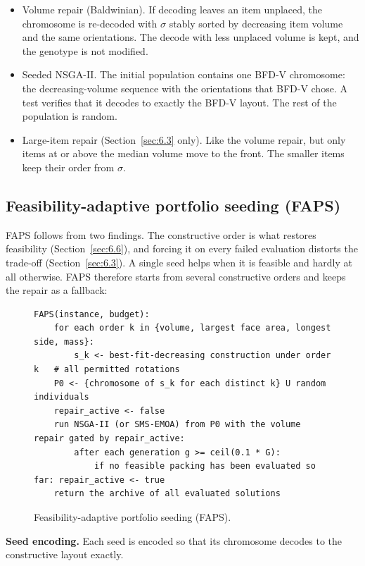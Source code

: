 \documentclass[journal]{IEEEtran}
\providecommand{\tightlist}{\setlength{\itemsep}{0pt}\setlength{\parskip}{0pt}}
\begin{document}
\begin{itemize}
\tightlist
\item
  Volume repair (Baldwinian). If decoding leaves an item unplaced, the chromosome is re-decoded with \(\sigma\) stably sorted by decreasing item volume and the same orientations. The decode with less unplaced volume is kept, and the genotype is not modified.
\item
  Seeded NSGA-II. The initial population contains one BFD-V chromosome: the decreasing-volume sequence with the orientations that BFD-V chose. A test verifies that it decodes to exactly the BFD-V layout. The rest of the population is random.
\item
  Large-item repair (Section~\ref{sec:6.3} only). Like the volume repair, but only items at or above the median volume move to the front. The smaller items keep their order from \(\sigma\).
\end{itemize}

\subsection{Feasibility-adaptive portfolio seeding (FAPS)}\label{sec:3.5}

FAPS follows from two findings. The constructive order is what restores feasibility (Section~\ref{sec:6.6}), and forcing it on every failed evaluation distorts the trade-off (Section~\ref{sec:6.3}). A single seed helps when it is feasible and hardly at all otherwise. FAPS therefore starts from several constructive orders and keeps the repair as a fallback:

\begin{figure}[!t]
\small
\begin{verbatim}
FAPS(instance, budget):
    for each order k in {volume, largest face area, longest side, mass}:
        s_k <- best-fit-decreasing construction under order k   # all permitted rotations
    P0 <- {chromosome of s_k for each distinct k} U random individuals
    repair_active <- false
    run NSGA-II (or SMS-EMOA) from P0 with the volume repair gated by repair_active:
        after each generation g >= ceil(0.1 * G):
            if no feasible packing has been evaluated so far: repair_active <- true
    return the archive of all evaluated solutions
\end{verbatim}
\caption{Feasibility-adaptive portfolio seeding (FAPS).}\label{alg:faps}
\end{figure}

\textbf{Seed encoding.} Each seed is encoded so that its chromosome decodes to the constructive layout exactly.
\end{document}
